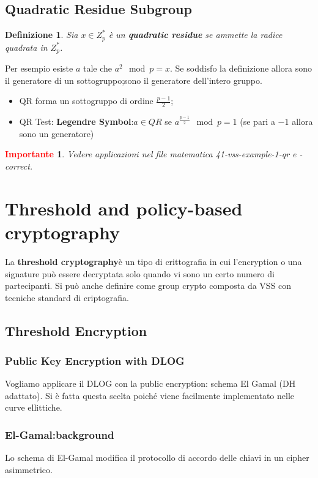 \documentclass{book}
\newtheorem{Definizione}{\textbf{Definizione}}
\newtheorem*{Importante}{\textbf{\textcolor{red}{Importante}}}
\begin{document}
\section{Quadratic Residue Subgroup}
\begin{Definizione}
    Sia \(x\in Z_{p}^{*}\) è un \textbf{quadratic residue} se ammette la radice quadrata in \(Z_{p}^{*}\).
\end{Definizione}
Per esempio esiste \(a\) tale che \(a^{2}\mod{p}=x\).\newline
Se soddisfo la definizione allora sono il generatore di un sottogruppo;\@altrimenti sono il generatore dell'intero gruppo.
\begin{itemize}
    \item QR forma un sottogruppo di ordine \(\frac{p-1}{2}\);
    \item QR Test: \textbf{Legendre Symbol}:\(a\in QR\) se \(a^{\frac{p-1}{2}}\mod{p}=1\) (se pari a \(-1\) allora sono un generatore)
\end{itemize}
\begin{Importante}
    Vedere applicazioni nel file matematica 41-vss-example-1-qr e -correct.
\end{Importante}
\chapter{Threshold and policy-based cryptography}
La \textbf{threshold cryptography}è un tipo di crittografia in cui l'encryption o una signature può essere decryptata solo quando vi sono un certo numero di partecipanti. Si può anche definire come group crypto composta da VSS con tecniche standard di criptografia\@.
\section{Threshold Encryption}
\subsection{Public Key Encryption with DLOG}
Vogliamo applicare il DLOG con la public encryption: schema El Gamal (DH adattato)\@. Si è fatta questa scelta poiché viene facilmente implementato nelle curve ellittiche\@.
\subsection{El-Gamal:background}
Lo schema di El-Gamal modifica il protocollo di accordo delle chiavi in un cipher asimmetrico\@.
\end{document}

